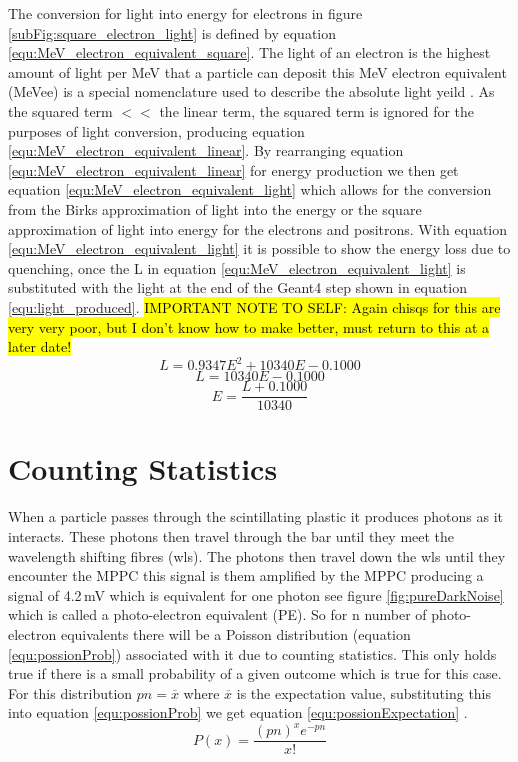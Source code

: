 The conversion for light into energy for electrons in figure \ref{subFig:square_electron_light} is defined by equation \ref{equ:MeV_electron_equivalent_square}. The light of an electron is the highest amount of light per MeV that a particle can deposit this MeV electron equivalent (MeVee) is a special nomenclature used to describe the absolute light yeild \cite{knoll_2010}. As the squared term $ << $ the linear term, the squared term is ignored for the purposes of light conversion, producing equation \ref{equ:MeV_electron_equivalent_linear}. By rearranging equation \ref{equ:MeV_electron_equivalent_linear} for energy production we then get equation \ref{equ:MeV_electron_equivalent_light} which allows for the conversion from the Birks approximation of light into the energy or the square approximation of light into energy for the electrons and positrons. With equation \ref{equ:MeV_electron_equivalent_light} it is possible to show the energy loss due to quenching, once the L in equation \ref{equ:MeV_electron_equivalent_light} is substituted with the light at the end of the Geant4 step shown in equation \ref{equ:light_produced}. \hl{IMPORTANT NOTE TO SELF: Again chisqs for this are very very poor, but I don't know how to make better, must return to this at a later date!} 
\begin{equation}
L = 0.9347E^2 + 10340E - 0.1000
\label{equ:MeV_electron_equivalent_square}
\end{equation}
\begin{equation}
L = 10340E - 0.1000
\label{equ:MeV_electron_equivalent_linear}
\end{equation}
\begin{equation}
E = \frac{L +0.1000}{10340} 
\label{equ:MeV_electron_equivalent_light}
\end{equation}

\section{Counting Statistics} \label{sec:geant4Simulation_countingStats}
When a particle passes through the scintillating plastic it produces photons as it interacts. These photons then travel through the bar until they meet the wavelength shifting fibres (wls). The photons then travel down the wls until they encounter the MPPC  this signal is them amplified by the MPPC producing a signal of 4.2\,mV which is equivalent for one photon see figure \ref{fig:pureDarkNoise} which is called a photo-electron equivalent (PE). So for n number of photo-electron equivalents there will be a Poisson distribution (equation \ref{equ:possionProb}) associated with it due to counting statistics. This only holds true if there is a small probability of a given outcome which is true for this case. For this distribution $pn = \overline{x}$ where $\overline{x}$ is the expectation value, substituting this into equation \ref{equ:possionProb} we get equation \ref{equ:possionExpectation} \cite{knoll_2010}.
\begin{equation}
P(x) = \frac{(pn)^x e^{-pn}}{x!}  
\label{equ:possionProb}
\end{equation}

